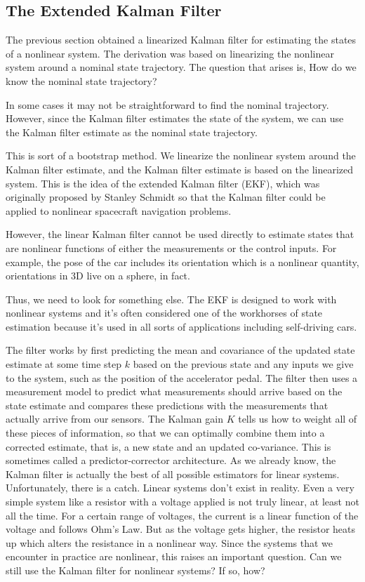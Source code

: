 \subsection{The Extended Kalman Filter }
\label{extended_kalman_filter}

The previous section obtained a linearized Kalman filter for estimating the states of 
a nonlinear system.  The derivation was based on linearizing the nonlinear system 
around a nominal state trajectory.  The question that arises is, How do we know 
the nominal state trajectory? 

In some cases it may not be straightforward to find 
the nominal trajectory.  However, since the Kalman  filter estimates the state of 
the system, we can use the Kalman filter estimate as the nominal state trajectory.

This is sort of a bootstrap method.  We linearize the nonlinear system around the 
Kalman filter estimate, and the Kalman filter estimate is based on the linearized 
system. This is the idea of the extended Kalman filter (EKF), which was originally 
proposed by Stanley Schmidt so that the Kalman filter could be applied to nonlinear 
spacecraft navigation problems.


However, the linear Kalman filter cannot be used directly
to estimate states that are nonlinear functions of either
the measurements or the control inputs. For example, the pose of the car includes its orientation which is
a nonlinear quantity, orientations in 3D live
on a sphere, in fact. 

Thus, we need to look for something else.  The EKF is designed to work with nonlinear systems and it's often
considered one of the workhorses of state estimation because it's used in all sorts of applications
including self-driving cars. 

The filter works by first predicting the mean and covariance of
the updated state estimate at some time step $k$ based on the previous state and any inputs
we give to the system, such as the position of
the accelerator pedal. The filter then uses a
measurement model to predict what measurements
should arrive based on the state estimate and compares
these predictions with the measurements that actually
arrive from our sensors. The Kalman gain $K$ tells us how to weight
all of these pieces of information, so that we can optimally combine
them into a corrected estimate, that is, a new state and
an updated co-variance. This is sometimes called a
predictor-corrector architecture. As we already know, the Kalman filter is actually the best of all possible estimators
for linear systems. Unfortunately, there is a catch. Linear systems don't exist in reality. Even a very simple system like a resistor with a voltage
applied is not truly linear, at least not all the time. For a certain range of voltages, the current is a linear function of
the voltage and follows Ohm's Law. But as the voltage gets higher, the resistor heats up which alters
the resistance in a nonlinear way. Since the systems that we encounter
in practice are nonlinear, this raises an important question. Can we still use the Kalman filter
for nonlinear systems? If so, how? 

